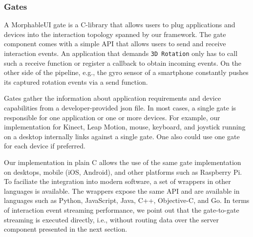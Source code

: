 \documentclass[twoside,twocolumn,10pt]{article}
\begin{document}
%



%
%
\subsubsection{Gates}

%
%
A MorphableUI gate is a C-library that allows users to plug applications and devices into the interaction topology spanned by our framework.
The gate component comes with a simple API that allows users to send and receive interaction events.
An application that demands \texttt{3D Rotation} only has to call such a receive function or register a callback to obtain incoming events. On the other side of the pipeline, e.g., the gyro sensor of a smartphone constantly pushes its captured rotation events via a send function.

Gates gather the information about application requirements and device capabilities from a developer-provided json file. In most cases, a single gate is responsible for one application or one or more devices. For example, our implementation for Kinect, Leap Motion, mouse, keyboard, and joystick running on a desktop internally links against a single gate. One also could use one gate for each device if preferred.


%
%
Our implementation in plain C allows the use of the same gate implementation on desktops, mobile (iOS, Android), and other platforms such as Raspberry Pi. To faciliate the integration into modern software, a set of wrappers in other languages is available. The wrappers expose the same API and are available in languages such as Python, JavaScript, Java, C++, Objective-C, and Go. In terms of interaction event streaming performance, we point out that the gate-to-gate streaming is executed directly, i.e., without routing data over the server component presented in the next section.
\end{document}
